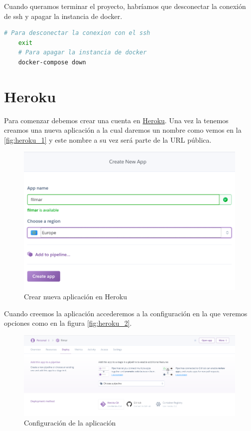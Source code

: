 Cuando queramos terminar el proyecto, habríamos que desconectar la conexión de ssh y apagar la instancia de docker.

\begin{lstlisting}[language=bash, caption=Salir de ssh y docker]
    # Para desconectar la conexion con el ssh
    exit 
    # Para apagar la instancia de docker
    docker-compose down
\end{lstlisting}

\section{Heroku}
\label{app:heroku}
Para comenzar debemos crear una cuenta en \href{https://www.heroku.com/}{Heroku}.
Una vez la tenemos creamos una nueva aplicación a la
 cual daremos un nombre como vemos en la \autoref{fig:heroku_1} y este
 nombre a su vez será parte de la URL pública.
\begin{figure}[H]
    \centering
    \includegraphics[width=6in]{figures/appendix-A/heroku_1.png}
    \caption{Crear nueva aplicación en Heroku}
    \label{fig:heroku_1}
\end{figure}
Cuando creemos la aplicación accederemos a la configuración en la que veremos
 opciones como en la figura \autoref{fig:heroku_2}.
\begin{figure}[H]
    \centering
    \includegraphics[width=6in]{figures/appendix-A/heroku_2.png}
    \caption{Configuración de la aplicación}
    \label{fig:heroku_2}
\end{figure}
